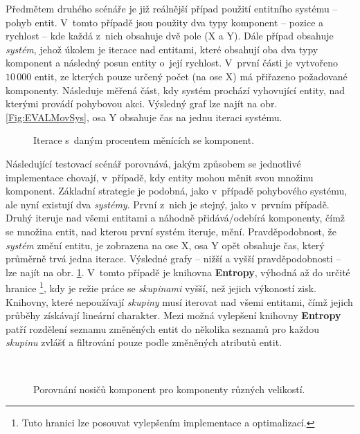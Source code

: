 Předmětem druhého scénáře je již reálnější případ použití entitního systému -- pohyb entit. V~tomto případě jsou použity dva typy komponent -- pozice a rychlost -- kde každá z~nich obsahuje dvě pole (X a Y). Dále případ obsahuje \emph{systém}, jehož úkolem je iterace nad entitami, které obsahují oba dva typy komponent a následný posun entity o~její rychlost. V~první části je vytvořeno $10\,000$ entit, ze kterých pouze určený počet (na ose X) má přiřazeno požadované komponenty. Následuje měřená část, kdy systém prochází vyhovující entity, nad kterými provádí pohybovou akci. Výsledný graf lze najít na obr. \ref{Fig:EVALMovSys}, osa Y obsahuje čas na jednu iteraci systému.

\begin{figure}[H]
	\begin{center}
	\end{center}
	\caption{Iterace s~daným procentem měnících se komponent.}
	\label{Fig:EVALAdvMovSys}
\end{figure}

Následující testovací scénář porovnává, jakým způsobem se jednotlivé implementace chovají, v~případě, kdy entity mohou měnit svou množinu komponent. Základní strategie je podobná, jako v~případě pohybového systému, ale nyní existují dva \emph{systémy}. První z~nich je stejný, jako v~prvním případě. Druhý iteruje nad všemi entitami a náhodně přidává/odebírá komponenty, čímž se množina entit, nad kterou první systém iteruje, mění. Pravděpodobnost, že \emph{systém} změní entitu, je zobrazena na ose X, osa Y opět obsahuje čas, který průměrně trvá jedna iterace. Výsledné grafy -- nižší a  vyšší pravděpodobnosti -- lze najít na obr. \ref{Fig:EVALAdvMovSys}. V~tomto případě je knihovna \textbf{Entropy}, výhodná až do určité hranice \footnote{Tuto hranici lze posouvat vylepšením implementace a optimalizací.}, kdy je režie práce se \emph{skupinami} vyšší, než jejich výkoností zisk. Knihovny, které nepoužívají \emph{skupiny} musí iterovat nad všemi entitami, čímž jejich průběhy získávají lineární charakter. Mezi možná vylepšení knihovny \textbf{Entropy} patří rozdělení seznamu změněných entit do několika seznamů pro každou \emph{skupinu} zvlášť a filtrování pouze podle změněných atributů entit.

\begin{figure}[H]
	\begin{center}
		 \\
	\end{center}
	\caption{Porovnání nosičů komponent pro komponenty různých velikostí.}
	\label{Fig:EVALHolders}
\end{figure}


